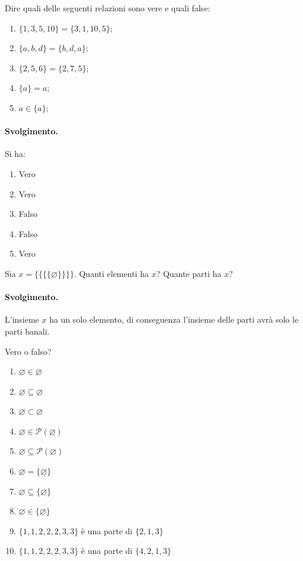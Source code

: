 \begin{exsbox}
	Dire quali delle seguenti relazioni sono vere e quali false:
	\begin{enumerate}
		\item $\{1,3,5,10\} = \{3,1,10,5\}$;
		\item $\{a,b,d\}=\{b,d,a\}$;
		\item $\{2,5,6\} = \{2,7,5\}$;
		\item $\{a\} = a$;
		\item $a \in \{a\}$;
	\end{enumerate}
\end{exsbox}
\paragraph{Svolgimento.} Si ha:
\begin{enumerate}
	\item Vero
	\item Vero
	\item Falso
	\item Falso
	\item Vero \hfill \blacksquare
\end{enumerate}
\begin{exsbox}
	Sia $x=\{\{\{\{\varnothing\}\}\}\}$. Quanti elementi ha $x$? Quante parti ha $x$?
\end{exsbox}
\paragraph{Svolgimento.} L'insieme $x$ ha un solo elemento, di conseguenza l'insieme delle parti avrà solo le parti banali. \hfill \blacksquare
\begin{exsbox}
	Vero o falso?
	\begin{enumerate}
		\item $\varnothing \in \varnothing$
		\item $\varnothing \subseteq \varnothing$
		\item $\varnothing \subset \varnothing$
		\item $\varnothing \in \mathcal{P}(\varnothing)$
		\item $\varnothing \subseteq \mathcal{P}(\varnothing)$
		\item $\varnothing = \{\varnothing\}$
		\item $\varnothing \subseteq \{\varnothing\}$
		\item $\varnothing \in \{\varnothing\}$
		\item $\{1,1,2,2,2,3,3\}$ è una parte di $\{2,1,3\}$
		\item $\{1,1,2,2,2,3,3\}$ è una parte di $\{4,2,1,3\}$
	\end{enumerate}
\end{exsbox}
